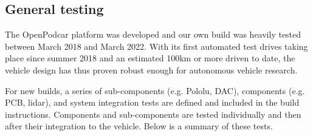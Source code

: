 \documentclass[a4paper]{article}
\begin{document}
	
	\subsection{General testing}\label{h.wbekh9ay82yu}
	
	
	
	
	
	
	
	The OpenPodcar platform was developed and our own build was heavily tested between March 2018 and March 2022. With its first automated test drives taking place since summer 2018 and an estimated 100km or more driven to date, the vehicle design has thus proven robust enough for autonomous vehicle research. 
	
	For new builds, a series of sub-components (e.g. Pololu, DAC), components (e.g. PCB, lidar), and system integration tests are defined and included in the build instructions. Components and sub-components are tested individually and then after their integration to the vehicle. Below is a summary of these tests.
	
\end{document}
